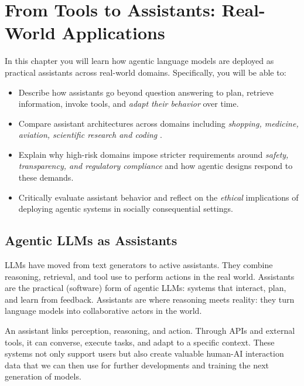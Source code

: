 \chapter[From Tools to Assistants]{From Tools to Assistants: Real-World Applications}
\label{sec:assist}

\begin{learningbox}
In this chapter you will learn how agentic language models are 
deployed as practical assistants across real-world domains. 
Specifically, you will be able to:
\begin{itemize}[leftmargin=*, nosep]
    \item Describe how assistants go beyond question answering to plan, retrieve information, invoke tools, and {\em adapt their behavior} over time.
    \item Compare assistant architectures across  domains including {\em shopping, medicine, aviation, scientific research and  coding}
    .
    \item Explain why high-risk domains impose stricter requirements  around {\em safety, transparency, and regulatory compliance} and how agentic designs respond to these demands.
    \item Critically evaluate assistant behavior and reflect on the  {\em ethical} implications of deploying agentic systems in socially consequential settings.
\end{itemize}
\end{learningbox}

\section{Agentic LLMs as Assistants}
LLMs have moved from text generators to active assistants.  
They combine reasoning, retrieval, and tool use to perform actions in the real world.  
Assistants are the practical (software) form of agentic LLMs: systems that interact, plan, and learn from feedback. 
Assistants are where reasoning meets reality:  
they turn language models into collaborative actors in the world.

An assistant links perception, reasoning, and action.  
Through APIs and external tools, it can converse, execute tasks, and adapt to a specific context. These systems not only support users but also create valuable human-AI interaction data that we can then use for further developments and training the next generation of models.

